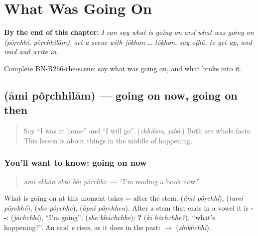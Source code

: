 
\chapter{What Was Going On}
\label{ch:bn-what-was-going-on}

\begin{chapteropening}
\textbf{By the end of this chapter:} \emph{I can say what is going on and what was going on (pôṛchhi, pôṛchhilām), set a scene with jôkhon … tôkhon, say oṭhā, to get up, and read and write  in .}

Complete BN-R266-the-scene: say what was going on, and what broke into it.
\end{chapteropening}

\section[\texorpdfstring{\bn{আমি} \bn{পড়ছিলাম} (āmi pôṛchhilām)}{আমি পড়ছিলাম (āmi pôṛchhilām)}]{  (āmi pôṛchhilām) — going on now, going on then}

\label{lesson:BN-C266-porchhilam}



\begin{quote}
Say \textquotedblleft{}I was at home\textquotedblright{} and \textquotedblleft{}I will go\textquotedblright{}. (\emph{chhilām}, \emph{jābô}.) Both are whole facts. This lesson is about things in the middle of happening.
\end{quote}

\subsection*{You'll want to know: going on now}
\begin{quote}
\textbf{    }
\end{quote}

\begin{quote}
\emph{āmi ekhôn ekṭā bôi pôṛchhi.} — \textquotedblleft{}I'm reading a book now.\textquotedblright{}
\end{quote}

What is going on at this moment takes \textbf{--} after the stem: \textbf{ } (\emph{āmi pôṛchhi}), \textbf{ } (\emph{tumi pôṛchhô}), \textbf{ } (\emph{she pôṛchhe}), \textbf{ } (\emph{āpni pôṛchhen}). After a stem that ends in a vowel it is \textbf{--}: \textbf{} (\emph{jāchchhi}), \textquotedblleft{}I'm going\textquotedblright{}; \textbf{ } (\emph{she khāchchhe}); \textbf{ ?} (\emph{kī hôchchhe?}), \textquotedblleft{}what's happening?\textquotedblright{}. An \textbf{} said \emph{e} rises, as it does in the past: \textbf{} $\to$ \textbf{} (\emph{shikhchhi}).

